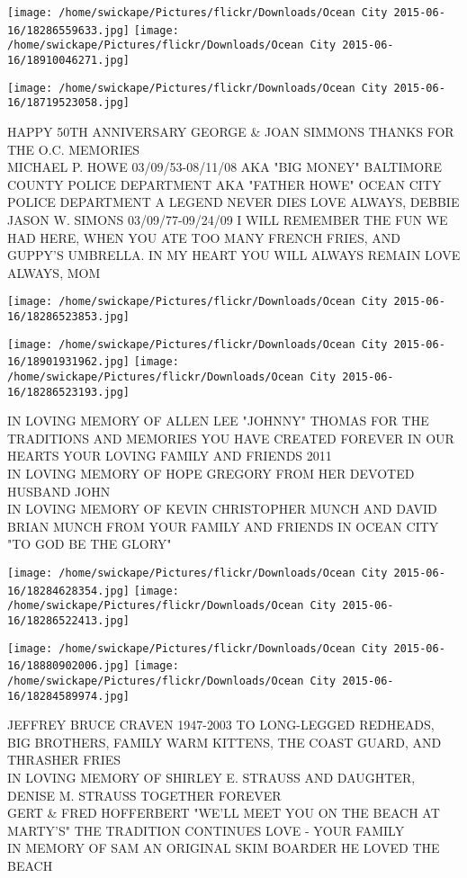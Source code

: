 \documentclass[10pt,letterpaper]{article}
\begin{document}
\texttt{[image: /home/swickape/Pictures/flickr/Downloads/Ocean City 2015-06-16/18286559633.jpg]}
\texttt{[image: /home/swickape/Pictures/flickr/Downloads/Ocean City 2015-06-16/18910046271.jpg]}

\texttt{[image: /home/swickape/Pictures/flickr/Downloads/Ocean City 2015-06-16/18719523058.jpg]}

HAPPY 50TH ANNIVERSARY GEORGE \& JOAN SIMMONS THANKS FOR THE O.C. MEMORIES\\
MICHAEL P. HOWE 03/09/53{-}08/11/08 AKA "BIG MONEY" BALTIMORE COUNTY POLICE DEPARTMENT AKA "FATHER HOWE" OCEAN CITY POLICE DEPARTMENT A LEGEND NEVER DIES LOVE ALWAYS, DEBBIE\\
JASON W. SIMONS 03/09/77{-}09/24/09 I WILL REMEMBER THE FUN WE HAD HERE, WHEN YOU ATE TOO MANY FRENCH FRIES, AND GUPPY'S UMBRELLA.  IN MY HEART YOU WILL ALWAYS REMAIN LOVE ALWAYS, MOM\\
\pagebreak

\texttt{[image: /home/swickape/Pictures/flickr/Downloads/Ocean City 2015-06-16/18286523853.jpg]}

\vspace{0.25in}
\texttt{[image: /home/swickape/Pictures/flickr/Downloads/Ocean City 2015-06-16/18901931962.jpg]}
\texttt{[image: /home/swickape/Pictures/flickr/Downloads/Ocean City 2015-06-16/18286523193.jpg]}

IN LOVING MEMORY OF ALLEN LEE "JOHNNY" THOMAS FOR THE TRADITIONS AND MEMORIES YOU HAVE CREATED FOREVER IN OUR HEARTS YOUR LOVING FAMILY AND FRIENDS 2011\\
IN LOVING MEMORY OF HOPE GREGORY FROM HER DEVOTED HUSBAND JOHN\\
IN LOVING MEMORY OF KEVIN CHRISTOPHER MUNCH AND DAVID BRIAN MUNCH FROM YOUR FAMILY AND FRIENDS IN OCEAN CITY "TO GOD BE THE GLORY"\\
\pagebreak

\texttt{[image: /home/swickape/Pictures/flickr/Downloads/Ocean City 2015-06-16/18284628354.jpg]}
\texttt{[image: /home/swickape/Pictures/flickr/Downloads/Ocean City 2015-06-16/18286522413.jpg]}

\texttt{[image: /home/swickape/Pictures/flickr/Downloads/Ocean City 2015-06-16/18880902006.jpg]}
\texttt{[image: /home/swickape/Pictures/flickr/Downloads/Ocean City 2015-06-16/18284589974.jpg]}

JEFFREY BRUCE CRAVEN 1947{-}2003 TO LONG{-}LEGGED REDHEADS, BIG BROTHERS, FAMILY WARM KITTENS, THE COAST GUARD, AND THRASHER FRIES\\
IN LOVING MEMORY OF SHIRLEY E. STRAUSS AND DAUGHTER, DENISE M. STRAUSS TOGETHER FOREVER\\
GERT \& FRED HOFFERBERT "WE'LL MEET YOU ON THE BEACH AT MARTY'S" THE TRADITION CONTINUES LOVE {-} YOUR FAMILY\\
IN MEMORY OF SAM AN ORIGINAL SKIM BOARDER HE LOVED THE BEACH\\
\pagebreak
\end{document}

